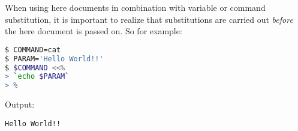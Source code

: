 When using here documents in combination with variable or command substitution,
it is important to realize that substitutions are carried out \emph{before} the
here document is passed on. So for example:

\lstset{basicstyle=\scriptsize, numbers=left, captionpos=b, tabsize=4}
\begin{lstlisting}[caption=Using a here document with substitutions,language={bash},
breaklines=true,xleftmargin=15pt,label=lst:Using a here document with substitutions]
$ COMMAND=cat
$ PARAM='Hello World!!'
$ $COMMAND <<%
> `echo $PARAM`
> %
\end{lstlisting}

Output:
\scriptsize
\begin{verbatim}
Hello World!!
\end{verbatim}
\normalsize
